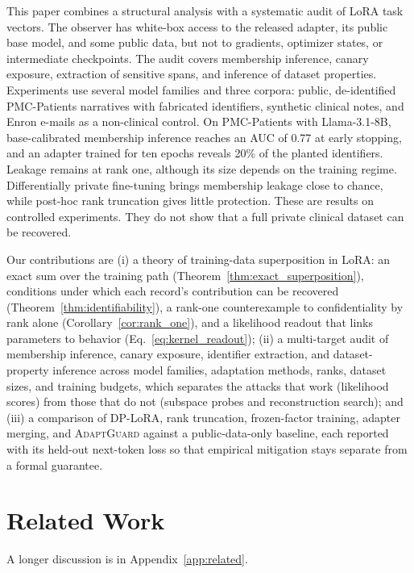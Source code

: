 \documentclass[11pt]{article}
\theoremstyle{plain}
\theoremstyle{definition}
\begin{document}
This paper combines a structural analysis with a systematic audit of LoRA task vectors.
The observer has white-box access to the released adapter, its public base model, and some public data, but not to gradients, optimizer states, or intermediate checkpoints.
The audit covers membership inference, canary exposure, extraction of sensitive spans, and inference of dataset properties.
Experiments use several model families and three corpora: public, de-identified PMC-Patients narratives with fabricated identifiers, synthetic clinical notes, and Enron e-mails as a non-clinical control.
On PMC-Patients with Llama-3.1-8B, base-calibrated membership inference reaches an AUC of 0.77 at early stopping, and an adapter trained for ten epochs reveals 20\% of the planted identifiers.
Leakage remains at rank one, although its size depends on the training regime.
Differentially private fine-tuning brings membership leakage close to chance, while post-hoc rank truncation gives little protection.
These are results on controlled experiments. They do not show that a full private clinical dataset can be recovered.

Our contributions are (i) a theory of training-data superposition in LoRA: an exact sum over the training path (Theorem~\ref{thm:exact_superposition}), conditions under which each record's contribution can be recovered (Theorem~\ref{thm:identifiability}), a rank-one counterexample to confidentiality by rank alone (Corollary~\ref{cor:rank_one}), and a likelihood readout that links parameters to behavior (Eq.~\eqref{eq:kernel_readout}); (ii) a multi-target audit of membership inference, canary exposure, identifier extraction, and dataset-property inference across model families, adaptation methods, ranks, dataset sizes, and training budgets, which separates the attacks that work (likelihood scores) from those that do not (subspace probes and reconstruction search); and (iii) a comparison of DP-LoRA, rank truncation, frozen-factor training, adapter merging, and \textsc{AdaptGuard} against a public-data-only baseline, each reported with its held-out next-token loss so that empirical mitigation stays separate from a formal guarantee.

\section{Related Work}
A longer discussion is in Appendix~\ref{app:related}.
\end{document}
